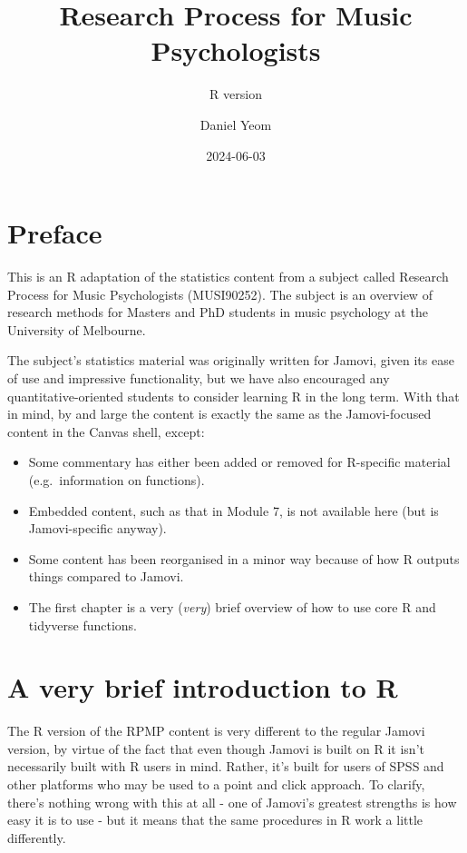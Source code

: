 \documentclass[
]{book}
\title{Research Process for Music Psychologists}
\subtitle{R version}
\author{Daniel Yeom}
\date{2024-06-03}
\providecommand{\tightlist}{%
  \setlength{\itemsep}{0pt}\setlength{\parskip}{0pt}}
\begin{document}
\maketitle

{
\setcounter{tocdepth}{1}
\tableofcontents
}
\hypertarget{preface}{%
\chapter{Preface}\label{preface}}

This is an R adaptation of the statistics content from a subject called Research Process for Music Psychologists (MUSI90252). The subject is an overview of research methods for Masters and PhD students in music psychology at the University of Melbourne.

The subject's statistics material was originally written for Jamovi, given its ease of use and impressive functionality, but we have also encouraged any quantitative-oriented students to consider learning R in the long term. With that in mind, by and large the content is exactly the same as the Jamovi-focused content in the Canvas shell, except:

\begin{itemize}
\tightlist
\item
  Some commentary has either been added or removed for R-specific material (e.g.~information on functions).
\item
  Embedded content, such as that in Module 7, is not available here (but is Jamovi-specific anyway).
\item
  Some content has been reorganised in a minor way because of how R outputs things compared to Jamovi.
\item
  The first chapter is a very (\emph{very}) brief overview of how to use core R and tidyverse functions.
\end{itemize}

\hypertarget{intro}{%
\chapter{A very brief introduction to R}\label{intro}}

The R version of the RPMP content is very different to the regular Jamovi version, by virtue of the fact that even though Jamovi is built on R it isn't necessarily built with R users in mind. Rather, it's built for users of SPSS and other platforms who may be used to a point and click approach. To clarify, there's nothing wrong with this at all - one of Jamovi's greatest strengths is how easy it is to use - but it means that the same procedures in R work a little differently.
\end{document}
